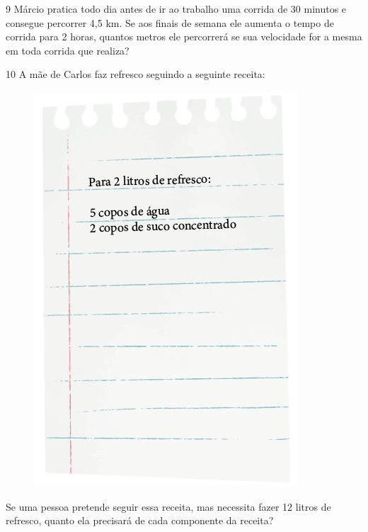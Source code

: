 \num{9} Márcio pratica todo dia antes de ir ao trabalho uma corrida de 30
minutos e consegue percorrer 4,5 km. Se aos finais de semana ele aumenta o
tempo de corrida para 2 horas, quantos metros ele percorrerá se sua
velocidade for a mesma em toda corrida que realiza?


\pagebreak
\num{10} A mãe de Carlos faz refresco seguindo a seguinte receita:

\begin{figure}[htpb!]
\centering
\includegraphics[width=.5\textwidth]{../ilustracoes/MAT5/SAEB_5ANO_MAT_figura79.png}
\end{figure}

Se uma pessoa pretende seguir essa receita, mas necessita fazer 12 litros de refresco, quanto ela precisará de cada componente da receita?

\begin{mdframed}[linewidth=2pt,linecolor=salmao]
\mbox{}\vspace*{4cm}
\end{mdframed}

